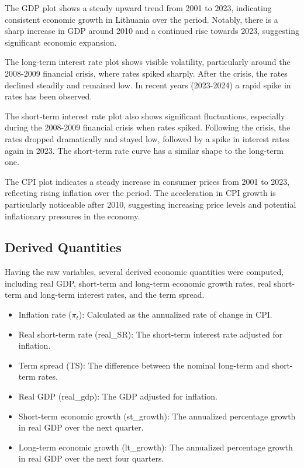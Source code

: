 \documentclass[12pt]{article}
\begin{document}
The GDP plot shows a steady upward trend from 2001 to 2023, indicating consistent economic growth in Lithuania over the period. Notably, there is a sharp increase in GDP around 2010 and a continued rise towards 2023, suggesting significant economic expansion.

The long-term interest rate plot shows visible volatility, particularly around the 2008-2009 financial crisis, where rates spiked sharply. After the crisis, the rates declined steadily and remained low. In recent years (2023-2024) a rapid spike in rates has been observed.

The short-term interest rate plot also shows significant fluctuations, especially during the 2008-2009 financial crisis when rates spiked. Following the crisis, the rates dropped dramatically and stayed low, followed by a spike in interest rates again in 2023. The short-term rate curve has a similar shape to the long-term one.

The CPI plot indicates a steady increase in consumer prices from 2001 to 2023, reflecting rising inflation over the period. The acceleration in CPI growth is particularly noticeable after 2010, suggesting increasing price levels and potential inflationary pressures in the economy.

\subsection{Derived Quantities}
Having the raw variables, several derived economic quantities were computed, including real GDP, short-term and long-term economic growth rates, real short-term and long-term interest rates, and the term spread. 

\begin{itemize}
    \item Inflation rate ($\pi_t$): Calculated as the annualized rate of change in CPI.
    \item Real short-term rate (real\_SR): The short-term interest rate adjusted for inflation.
    \item Term spread (TS): The difference between the nominal long-term and short-term rates.
    \item Real GDP (real\_gdp): The GDP adjusted for inflation.
    \item Short-term economic growth (st\_growth): The annualized percentage growth in real GDP over the next quarter.
    \item Long-term economic growth (lt\_growth): The annualized percentage growth in real GDP over the next four quarters.
\end{itemize}
\end{document}

